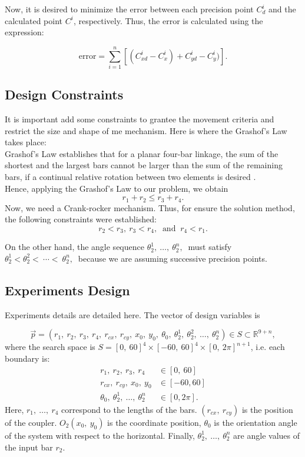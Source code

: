 \documentclass[12pt,letterpape]{article}
\begin{document}
Now, it is desired to minimize the error between each precision point $C^i_d$ and
the calculated point $C^i$, respectively. Thus, the error is calculated using the
expression:

$$
	\text{error} = \sum_{i=1}^n \left[ (C_{xd}^i - C_x^i) + C_{yd}^i - C_y^i) \right]. 
$$

% 
\subsection{Design Constraints} %
\label{sub:design_constraints}
It is important add some constraints to grantee the movement criteria and restrict
the size and shape of me mechanism. Here is where the Grashof's Law takes place:\\

Grashof's Law establishes that for a planar four-bar linkage, the sum of the shortest
and the largest bars cannot be larger than the sum of the remaining bars, if a
continual relative rotation between two elements is desired \cite{david2005}. \\

Hence, applying the Grashof's Law to our problem, we obtain
$$
r_1 + r_2 \leq r_3 + r_4.
$$
% 
Now, we need a Crank-rocker mechanism. Thus, for ensure the solution method, the
following constraints were established:
$$
r_2 < r_3, \ r_3 < r_4, \ \text{ and } \ r_4 < r_1.
$$

On the other hand, the angle sequence $\theta_2^1,\ \ldots,\ \theta_2^n,\ $ must
satisfy $ \theta_2^1 < \theta_2^2 <\ \cdots < \ \theta_2^n,\ $ because we are
assuming successive precision points.

\subsection{Experiments Design} %
\label{sec:experiments_design}

Experiments details are detailed here. The vector of design variables is

\begin{equation}
	\vec{p} = ( r_1,\ r_2,\ r_3,\ r_4,\ r_{cx},\ r_{cy},\ x_0,\ y_0,\ \theta_0,\ \theta_2^1,\ \theta_2^2,\ \ldots,\ \theta_2^n  ) \in S \subset \mathbb{R}^{9+n},
	\label{eqn:desigVars}
\end{equation}
% 
where the search space is $S = [0,\ 60]^4 \times [-60,\ 60]^4 \times [0,\ 2\pi ]^{n+1} $, i.e. each boundary is:
% 
% 
\begin{align*}
       r_1,\ r_2,\ r_3,\ r_4 & \in [0,\ 60]\\
 r_{cx},\ r_{cy},\ x_0,\ y_0 & \in [-60, 60]\\	
\theta_0,\ \theta_2^1,\ \ldots,\ \theta_2^n &\in [0, 2\pi].
\end{align*}
% 
Here, $r_1,\ \ldots,\ r_4$ correspond to the lengths of the bars. $(r_{cx},\ r_{cy})$
is the position of the coupler. $O_2(x_0,\ y_0)$ is the coordinate position,
$\theta_0$ is the orientation angle of the system with respect to the horizontal.
Finally, $\theta_2^1,\ \ldots,\ \theta_2^n$ are angle values of the input bar $r_2$.\\
% 
\end{document}
